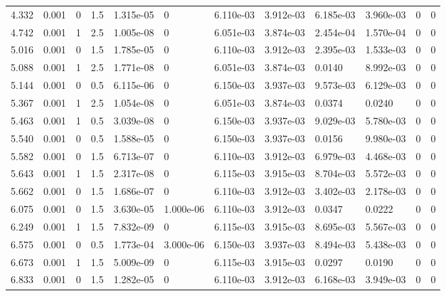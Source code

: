 \documentclass[preview]{standalone}
\begin{document}
{{\begin{tabular}{L{1.2cm}C{1.2cm} C{0.3cm}C{0.5cm} C{1.4cm}C{1.4cm} C{1.4cm}C{1.4cm} C{1.6cm}C{1.6cm} C{1.6cm}C{1.6cm}}
  4.332  &  0.001  & 0     & 1.5 &  1.315e-05  & 0  &  6.110e-03&   3.912e-03& 6.185e-03 & 3.960e-03   &  0 & 0  \\ 
  4.742  &  0.001  & 1     & 2.5 &  1.005e-08  & 0  &  6.051e-03&   3.874e-03& 2.454e-04 & 1.570e-04   &  0 & 0  \\ 
  5.016  &  0.001  & 0     & 1.5 &  1.785e-05  & 0  &  6.110e-03&   3.912e-03& 2.395e-03 & 1.533e-03   &  0 & 0  \\ 
  5.088  &  0.001  & 1     & 2.5 &  1.771e-08  & 0  &  6.051e-03&   3.874e-03& 0.0140 & 8.992e-03   &  0 & 0  \\ 
  5.144  &  0.001  & 0     & 0.5 &  6.115e-06  & 0  &  6.150e-03&   3.937e-03& 9.573e-03 & 6.129e-03   &  0 & 0  \\ 
  5.367  &  0.001  & 1     & 2.5 &  1.054e-08  & 0  &  6.051e-03&   3.874e-03& 0.0374 & 0.0240   &  0 & 0  \\ 
  5.463  &  0.001  & 1     & 0.5 &  3.039e-08  & 0  &  6.150e-03&   3.937e-03& 9.029e-03 & 5.780e-03   &  0 & 0  \\ 
  5.540  &  0.001  & 0     & 0.5 &  1.588e-05  & 0  &  6.150e-03&   3.937e-03& 0.0156 & 9.980e-03   &  0 & 0  \\ 
  5.582  &  0.001  & 0     & 1.5 &  6.713e-07  & 0  &  6.110e-03&   3.912e-03& 6.979e-03 & 4.468e-03   &  0 & 0  \\ 
  5.643  &  0.001  & 1     & 1.5 &  2.317e-08  & 0  &  6.115e-03&   3.915e-03& 8.704e-03 & 5.572e-03   &  0 & 0  \\ 
  5.662  &  0.001  & 0     & 1.5 &  1.686e-07  & 0  &  6.110e-03&   3.912e-03& 3.402e-03 & 2.178e-03   &  0 & 0  \\ 
  6.075  &  0.001  & 0     & 1.5 &  3.630e-05  & 1.000e-06  &  6.110e-03&   3.912e-03& 0.0347 & 0.0222   &  0 & 0  \\ 
  6.249  &  0.001  & 1     & 1.5 &  7.832e-09  & 0  &  6.115e-03&   3.915e-03& 8.695e-03 & 5.567e-03   &  0 & 0  \\ 
  6.575  &  0.001  & 0     & 0.5 &  1.773e-04  & 3.000e-06  &  6.150e-03&   3.937e-03& 8.494e-03 & 5.438e-03   &  0 & 0  \\ 
  6.673  &  0.001  & 1     & 1.5 &  5.009e-09  & 0  &  6.115e-03&   3.915e-03& 0.0297 & 0.0190   &  0 & 0  \\ 
  6.833  &  0.001  & 0     & 1.5 &  1.282e-05  & 0  &  6.110e-03&   3.912e-03& 6.168e-03 & 3.949e-03   &  0 & 0  \\ 
\hline 
\end{tabular} 

}}
\end{document}
